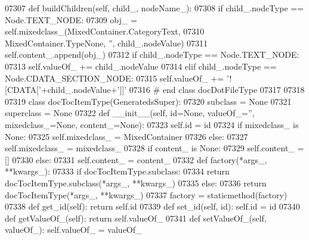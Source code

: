 \begin{DoxyCode}
{{{{{{{{{{{{{{{{{{{{{{{{{{{{{{{{{{{{{{{{{{{{{{{{{{{{{{{{{{{{{{{{{{{{{{{{{{{{{{{{{{{{{{{{{{{{{{{{{{{{{{{{{{{{{{{{{{{{{{{{{{{{{{{{{{{{{{{{{{{{{{{{{{{{{{{{{{{{{{{{{{{{{{{{{{{{{{{{{{{{{{{{{{{{{{{{{{{{{{{{{{{{{{{{{{{{{{{{{{{{{{{{{{{{{{{{{{{{{{{{{{{{{{{{{{{{{{{{{{{{{{{{{{{{{{{{{{{{{{{{{{{{{{{{{{{{{{{{{{{{{{{{{{{{{{{{{{{{{{{{{{{{{{{{{{{{{{{{{{{{{{{{{{{{{{{{{{{{{{{{{{{{{{{{{{{{{{{{{{{{{{{{{{{{{{{{{{{{{{{{{{{{{{{{{{{{{{{{{{{{{{{{{{{{{{{{{{{{{{{{{{{{{{{{{{{{{{{{{{{{{07307     \textcolor{keyword}{def }buildChildren(self, child\_, nodeName\_):
07308         \textcolor{keywordflow}{if} child\_.nodeType == Node.TEXT\_NODE:
07309             obj\_ = self.mixedclass_(MixedContainer.CategoryText,
07310                 MixedContainer.TypeNone, \textcolor{stringliteral}{''}, child\_.nodeValue)
07311             self.content\_.append(obj\_)
07312         \textcolor{keywordflow}{if} child\_.nodeType == Node.TEXT\_NODE:
07313             self.valueOf_ += child\_.nodeValue
07314         \textcolor{keywordflow}{elif} child\_.nodeType == Node.CDATA\_SECTION\_NODE:
07315             self.valueOf_ += \textcolor{stringliteral}{'![CDATA['}+child\_.nodeValue+\textcolor{stringliteral}{']]'}
07316 \textcolor{comment}{# end class docDotFileType}
07317 
07318 
07319 \textcolor{keyword}{class }docTocItemType(GeneratedsSuper):
07320     subclass = \textcolor{keywordtype}{None}
07321     superclass = \textcolor{keywordtype}{None}
07322     \textcolor{keyword}{def }__init__(self, id=None, valueOf\_='', mixedclass\_=None, content\_=None):
07323         self.id = id
07324         \textcolor{keywordflow}{if} mixedclass\_ \textcolor{keywordflow}{is} \textcolor{keywordtype}{None}:
07325             self.mixedclass_ = MixedContainer
07326         \textcolor{keywordflow}{else}:
07327             self.mixedclass_ = mixedclass\_
07328         \textcolor{keywordflow}{if} content\_ \textcolor{keywordflow}{is} \textcolor{keywordtype}{None}:
07329             self.content_ = []
07330         \textcolor{keywordflow}{else}:
07331             self.content_ = content\_
07332     \textcolor{keyword}{def }factory(*args\_, **kwargs\_):
07333         \textcolor{keywordflow}{if} docTocItemType.subclass:
07334             \textcolor{keywordflow}{return} docTocItemType.subclass(*args\_, **kwargs\_)
07335         \textcolor{keywordflow}{else}:
07336             \textcolor{keywordflow}{return} docTocItemType(*args\_, **kwargs\_)
07337     factory = staticmethod(factory)
07338     \textcolor{keyword}{def }get_id(self): \textcolor{keywordflow}{return} self.id
07339     \textcolor{keyword}{def }set_id(self, id): self.id = id
07340     \textcolor{keyword}{def }getValueOf_(self): \textcolor{keywordflow}{return} self.valueOf\_
07341     \textcolor{keyword}{def }setValueOf_(self, valueOf\_): self.valueOf\_ = valueOf\_
}}}}}}}}}}}}}}}}}}}}}}}}}}}}}}}}}}}}}}}}}}}}}}}}}}}}}}}}}}}}}}}}}}}}}}}}}}}}}}}}}}}}}}}}}}}}}}}}}}}}}}}}}}}}}}}}}}}}}}}}}}}}}}}}}}}}}}}}}}}}}}}}}}}}}}}}}}}}}}}}}}}}}}}}}}}}}}}}}}}}}}}}}}}}}}}}}}}}}}}}}}}}}}}}}}}}}}}}}}}}}}}}}}}}}}}}}}}}}}}}}}}}}}}}}}}}}}}}}}}}}}}}}}}}}}}}}}}}}}}}}}}}}}}}}}}}}}}}}}}}}}}}}}}}}}}}}}}}}}}}}}}}}}}}}}}}}}}}}}}}}}}}}}}}}}}}}}}}}}}}}}}}}}}}}}}}}}}}}}}}}}}}}}}}}}}}}}}}}}}}}}}}}}}}}}}}}}}}}}}}}}}}}}}}}}}}}}}}}}}}}}}}}}}}}}}}}}}}}}}}}
\end{DoxyCode}
